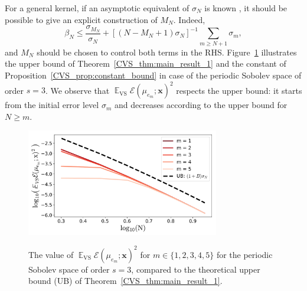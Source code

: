 \documentclass[twoside,11pt]{book}
\newtheorem{theorem}{Theorem}
\numberwithin{theorem}{chapter}
\numberwithin{definition}{chapter}
\numberwithin{proposition}{chapter}
\numberwithin{corollary}{chapter}
\numberwithin{example}{chapter}
\numberwithin{lemma}{chapter}
\numberwithin{assumption}{chapter}
\numberwithin{equation}{chapter}
\numberwithin{figure}{chapter}
\DeclareMathOperator{\VS}{\mathrm{VS}}
\DeclareMathOperator{\EX}{\mathbb{E}}
\newcommand{\pc}[1]{\textcolor{blue}{#1}}
\begin{document}
 For a general kernel, if an asymptotic equivalent of $\sigma_{N}$ is known \parencite{Wid63,Wid64,Bac17}, it should be possible to give an explicit construction of $M_N$. Indeed,
\begin{equation}
 \beta_{N} \leq \frac{\sigma_{M_{N}}}{\sigma_{N}} + [{(N-M_{N}+1)\sigma_{N}}]^{-1} \sum\limits_{m \geq N+1}\sigma_{m},
\end{equation}
and $M_{N}$ should be chosen to control both terms in the RHS.
%
Figure~\ref{CVS_fig:the_only_one_for_the_moment} illustrates the upper bound of Theorem~\ref{CVS_thm:main_result_1} and the constant of Proposition~\ref{CVS_prop:constant_bound} in case of the periodic Sobolev space of order $s=3$. We observe that $\EX_{\VS} \mathcal{E}(\mu_{e_m};\bm{x})^{2}$ respects the upper bound: it starts from the initial error level $\sigma_m$ and decreases according to the upper bound for $N \geq m$.




\begin{figure}[]
    \centering
\includegraphics[width= 0.75\textwidth]{img/icml/EX_VS_err_n_s_3.pdf}\\
\caption{\label{CVS_fig:the_only_one_for_the_moment} The value of $\EX_{\VS} \mathcal{E}(\mu_{e_{m}};\bm{x})^{2}$ for $m \in \{1,2,3,4,5\}$ for the periodic Sobolev space of order $s =3$, compared to the theoretical upper bound (UB) of Theorem~\ref{CVS_thm:main_result_1}.}
\end{figure}
\end{document}
